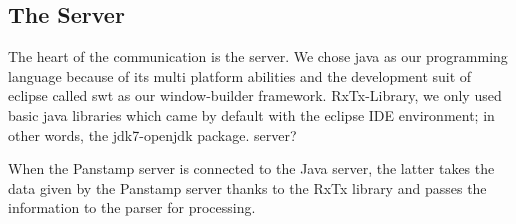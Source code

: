 \subsection{The Server}
The heart of the communication is the server. We chose java\cite{java} as our
programming language because of its multi platform abilities and the development
suit of eclipse\cite{eclipse} called swt\cite{swt} as our window-builder
framework.%
RxTx-Library\cite{rxtx}, we only used basic java libraries which came by default
with the eclipse IDE\cite{ide} environment; in other words, the
jdk7-openjdk\cite{open_jdk} package. %
server?

When the Panstamp server is connected to the Java server, the latter takes the data given by the Panstamp server thanks to the RxTx library \cite{rxtx} and passes the information to the parser for processing. %


